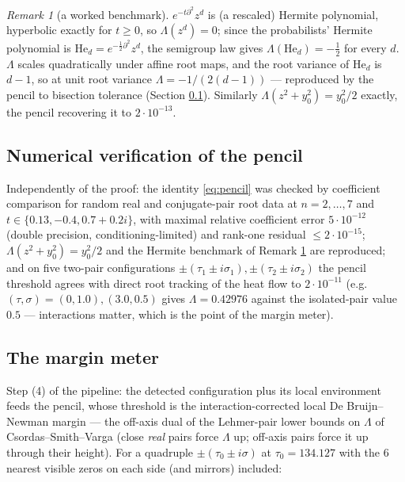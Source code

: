\documentclass[11pt]{amsart}
\theoremstyle{remark}
\newtheorem{remark}[theorem]{Remark}
\begin{document}
\begin{remark}[a worked benchmark]\label{rem:hermite}
$e^{-t\partial^2}z^d$ is (a rescaled) Hermite polynomial, hyperbolic exactly for $t\ge 0$, so $\Lambda(z^d)=0$; since the probabilists' Hermite polynomial is $\mathrm{He}_d=e^{-\frac12\partial^2}z^d$, the semigroup law gives $\Lambda(\mathrm{He}_d)=-\tfrac12$ for every $d$. $\Lambda$ scales quadratically under affine root maps, and the root variance of $\mathrm{He}_d$ is $d-1$, so at unit root variance $\Lambda=-1/(2(d-1))$ --- reproduced by the pencil to bisection tolerance (Section \ref{sec:pencilnum}). Similarly $\Lambda(z^2+y_0^2)=y_0^2/2$ exactly, the pencil recovering it to $2\cdot 10^{-13}$.
\end{remark}

\subsection{Numerical verification of the pencil}\label{sec:pencilnum}
Independently of the proof: the identity \eqref{eq:pencil} was checked by coefficient comparison for random real and conjugate-pair root data at $n=2,\dots,7$ and $t\in\{0.13,-0.4,0.7+0.2i\}$, with maximal relative coefficient error $5\cdot 10^{-12}$ (double precision, conditioning-limited) and rank-one residual $\le 2\cdot 10^{-15}$; $\Lambda(z^2+y_0^2)=y_0^2/2$ and the Hermite benchmark of Remark \ref{rem:hermite} are reproduced; and on five two-pair configurations $\pm(\tau_1\pm i\sigma_1),\pm(\tau_2\pm i\sigma_2)$ the pencil threshold agrees with direct root tracking of the heat flow to $2\cdot 10^{-11}$ (e.g.\ $(\tau,\sigma)=(0,1.0),(3.0,0.5)$ gives $\Lambda=0.42976$ against the isolated-pair value $0.5$ --- interactions matter, which is the point of the margin meter).

\subsection{The margin meter}\label{sec:margin}
Step (4) of the pipeline: the detected configuration plus its local environment feeds the pencil, whose threshold is the interaction-corrected local De Bruijn--Newman margin --- the off-axis dual of the Lehmer-pair lower bounds on $\Lambda$ of Csordas--Smith--Varga \cite{CSV} (close \emph{real} pairs force $\Lambda$ up; off-axis pairs force it up through their height). For a quadruple $\pm(\tau_0\pm i\sigma)$ at $\tau_0=134.127$ with the $6$ nearest visible zeros on each side (and mirrors) included:
\end{document}
